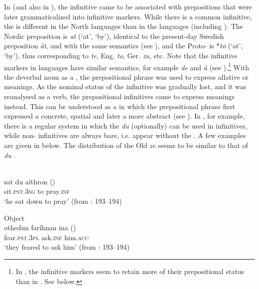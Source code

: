 \documentclass[output=paper]{langscibook}
\begin{document}
In  (and also in ), the infinitive came to be associated with prepositions that were later grammaticalized into infinitive markers. While there is a common  infinitive, the  is different in the North  languages than in the  languages (including ). The Nordic preposition is \textit{at} (‘at’, ‘by’), identical to the present-day Swedish preposition \textit{åt}, and with the same semantics (see \citealt{Hellquist1948}), and the Proto- is *\textit{tō} (‘at’, ‘by’), thus corresponding to  \textit{te}, Eng. \textit{to}, Ger. \textit{zu}, etc. Note that the infinitive markers in  languages have similar semantics, for example  \textit{de} and \textit{à} (see \citealt[15]{Beckman1934}).\footnote{In , the infinitive markers seem to retain more of their prepositional status than in . See  below.}  With the deverbal noun as a , the prepositional phrase was used to express allative or  meanings. As the nominal status of the infinitive was gradually lost, and it was reanalysed as a verb, the prepositional infinitives came to express  meanings instead. This can be understood as a  in which the prepositional phrase first expressed a concrete, spatial  and later a more abstract  (see \citealt{Los2005}). In , for example, there is a regular system in which the  \textit{du} (optionally) can be used in  infinitives, while non- infinitives are always bare, i.e. appear without the . A few examples are given in  below. The distribution of the Old  \textit{ze} seems to be similar to that of  \textit{du} \citep{Haspelmath1989}. 

\ea
\label{ex:kalm:3}
\ea {}\\\label{ex:kalm:3a}
\gll sat du aíthron ()\\
sit.\textsc{pst.3sg} to pray.\textsc{inf}\\
\glt ‘he sat down to pray’ (from \citealt{Wright1954}: 193–194) 

\ex Object\\\label{ex:kalm:3b}
\gll othedun faríhnan ina ()\\
fear\textsc{.pst.3pl} ask.\textsc{inf} him.\textsc{acc}\\
\glt ‘they feared to ask him’ (from \citealt{Wright1954}: 193–194)
\end{document}

